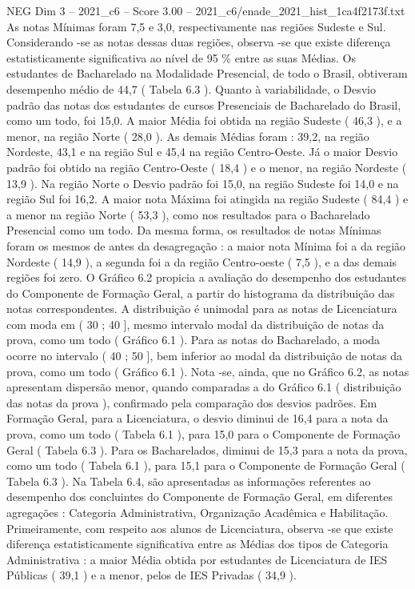 \begin{textsample}{NEG Dim 3 – 2021\_c6 – Score 3.00 – 2021\_c6/enade\_2021\_hist\_1ca4f2173f.txt}
As notas Mínimas foram 7,5 e 3,0, respectivamente nas regiões Sudeste e Sul.
Considerando -se as notas dessas duas regiões, observa -se que existe diferença estatisticamente significativa ao nível de 95 \% entre as suas Médias.
Os estudantes de Bacharelado na Modalidade Presencial, de todo o Brasil, obtiveram desempenho médio de 44,7 ( Tabela 6.3 ).
Quanto à variabilidade, o Desvio padrão das notas dos estudantes de cursos Presenciais de Bacharelado do Brasil, como um todo, foi 15,0.
A maior Média foi obtida na região Sudeste ( 46,3 ), e a menor, na região Norte ( 28,0 ).
As demais Médias foram : 39,2, na região Nordeste, 43,1 e na região Sul e 45,4 na região Centro-Oeste.
Já o maior Desvio padrão foi obtido na região Centro-Oeste ( 18,4 ) e o menor, na região Nordeste ( 13,9 ).
Na região Norte o Desvio padrão foi 15,0, na região Sudeste foi 14,0 e na região Sul foi 16,2.
A maior nota Máxima foi atingida na região Sudeste ( 84,4 ) e a menor na região Norte ( 53,3 ), como nos resultados para o Bacharelado Presencial como um todo.
Da mesma forma, os resultados de notas Mínimas foram os mesmos de antes da desagregação : a maior nota Mínima foi a da região Nordeste ( 14,9 ), a segunda foi a da região Centro-oeste ( 7,5 ), e a das demais regiões foi zero.
O Gráfico 6.2 propicia a avaliação do desempenho dos estudantes do Componente de Formação Geral, a partir do histograma da distribuição das notas correspondentes.
A distribuição é unimodal para as notas de Licenciatura com moda em ( 30 ; 40 ], mesmo intervalo modal da distribuição de notas da prova, como um todo ( Gráfico 6.1 ).
Para as notas do Bacharelado, a moda ocorre no intervalo ( 40 ; 50 ], bem inferior ao modal da distribuição de notas da prova, como um todo ( Gráfico 6.1 ).
Nota -se, ainda, que no Gráfico 6.2, as notas apresentam dispersão menor, quando comparadas a do Gráfico 6.1 ( distribuição das notas da prova ), confirmado pela comparação dos desvios padrões.
Em Formação Geral, para a Licenciatura, o desvio diminui de 16,4 para a nota da prova, como um todo ( Tabela 6.1 ), para 15,0 para o Componente de Formação Geral ( Tabela 6.3 ).
Para os Bacharelados, diminui de 15,3 para a nota da prova, como um todo ( Tabela 6.1 ), para 15,1 para o Componente de Formação Geral ( Tabela 6.3 ).
Na Tabela 6.4, são apresentadas as informações referentes ao desempenho dos concluintes do Componente de Formação Geral, em diferentes agregações : Categoria Administrativa, Organização Acadêmica e Habilitação.
Primeiramente, com respeito aos alunos de Licenciatura, observa -se que existe diferença estatisticamente significativa entre as Médias dos tipos de Categoria Administrativa : a maior Média obtida por estudantes de Licenciatura de IES Públicas ( 39,1 ) e a menor, pelos de IES Privadas ( 34,9 ).

\end{textsample}
